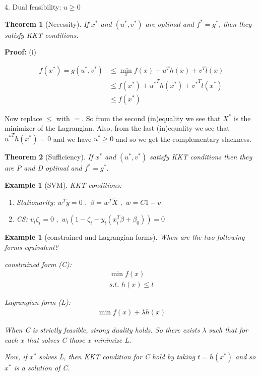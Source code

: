 \documentclass[10pt]{article}
\newcounter{lecnum}
\newtheorem{theorem}{Theorem}[lecnum]
\newtheorem{example}[ex]{Example}
\begin{document}
4. Dual feasibility:  $u \ge 0$


\begin{theorem}[Necessity]
If $x^*$ and $(u^*,v^*)$ are optimal and $f^*=g^*$, then they satisfy KKT conditions.
\end{theorem}

\textbf{Proof:} (i) 

\begin{equation}
\begin{aligned}
f(x^*)=g(u^*,v^*) & \le \min_x f(x)+u^Th(x)+v^Tl(x)\\
				  & \le f(x^*)+{u^*}^T h(x^*)+{v^*}^T l(x^*)\\
				  & \le f(x^*)
\end{aligned}
\end{equation} 

Now replace $\le$ with $=$. So from the second (in)equality we see that $X^*$ is the minimizer of the Lagrangian. Also, from the last (in)equality we see that ${u^*}^T h(x^*)=0$ and we have $u^* \ge 0$ and so we get the complementary slackness.

\begin{theorem}[Sufficiency]
	If $x^*$ and $(u^*,v^*)$ satisfy KKT conditions then they are P and D optimal and $f^*=g^*$.
\end{theorem}

\begin{example}[SVM]
	KKT conditions:
	\begin{enumerate}
		\item Stationarity: $w^Ty=0 \,\,,\,\, \beta=w^T\tilde{X} \,\,,\,\, w=C1-v$
		\item CS: $v_i\zeta_i=0 \,\,,\,\, w_i(1-\zeta_i-y_i(x_i^T\beta+\beta_0))=0$
	\end{enumerate}
\end{example}

\begin{example}[constrained and Lagrangian forms]
	When are the two following forms equivalent?
	
	constrained form (C):
	\begin{equation}
	\begin{aligned}
		\min f(x)\\
		s.t. \,\, h(x) \le t
	\end{aligned}
	\end{equation}
	
	Lagrangian form (L):
	\begin{equation}
	\begin{aligned}
	\min f(x)+\lambda h(x)
	\end{aligned}
	\end{equation}

When C is strictly feasible, strong duality holds. So there exists $\lambda$ such that for each $x$ that solves C those $x$ minimize L.

Now, if $x^*$ solves L, then KKT condition for C hold by taking $t=h(x^*)$ and so $x^*$ is a solution of C.
\end{example}

   


\end{document}
